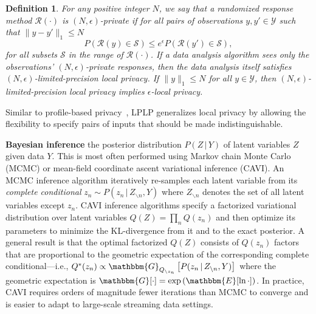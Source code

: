 \documentclass{article}
\newtheorem{definition}{Definition}
\newcommand{\Gqnot}[2]{\mathbbm{G}_{Q_{\backslash #1}}\left[#2\right]}
\begin{document}
\begin{definition}
\label{def:lplp}
For any positive integer $N$, we say that a randomized response method
$\mathcal{R}(\cdot)$ is $(N, \epsilon)$-private if for all pairs of
observations $y, y' \in \mathcal{Y}$ such that $\|y - y'\|_1 \leq N$
\begin{equation}
  \label{eqn:lp_local_privacy}
    P\left(\mathcal{R}(y) \in \mathcal{S}\right) \leq e^\epsilon
      P\left(\mathcal{R}(y') \in \mathcal{S}\right),
        \end{equation}
for all subsets $\mathcal{S}$ in the range of $\mathcal{R}(\cdot)$.
If a data analysis algorithm sees only the observations' $(N,
\epsilon)$-private responses, then the data analysis itself satisfies
$(N, \epsilon)$-limited-precision local privacy. If $\|y\|_1 \leq N$
for all $y \in \mathcal{Y}$, then $(N, \epsilon)$-limited-precision
local privacy implies $\epsilon$-local privacy.
\end{definition}

Similar to profile-based privacy~\cite{GC19}, LPLP generalizes local
privacy by allowing the flexibility to specify pairs of inputs that
should be made indistinguishable.


  \textbf{Bayesian inference}  the posterior
  distribution $P(Z\,|\,Y)$ of latent variables $Z$ given data $Y$. This is
  most often performed using Markov chain Monte Carlo (MCMC) or mean-field
  coordinate ascent variational inference (CAVI). An MCMC inference algorithm
  iteratively re-samples each latent variable from its \emph{complete
  conditional} $z_n \sim P(z_n\,|\,Z_{\backslash n}, Y)$ where $Z_{\backslash
  n}$ denotes the set of all latent variables except $z_n$. CAVI inference
  algorithms specify a factorized variational distribution over latent
  variables $Q(Z) = \prod_n Q(z_n)$ and then optimize its parameters to
  minimize the KL-divergence from it and to the exact posterior. A general
  result is that the optimal factorized $Q(Z)$ consists of $Q(z_n)$ factors
  that are proportional to the geometric expectation of the corresponding
  complete conditional---i.e., $Q^*(z_n) \propto
  \Gqnot{z_n}{P(z_n\,|\,Z_{\backslash n}, Y)}$ where the geometric expectation
  is $\mathbbm{G}[\cdot]=\exp\left(\mathbbm{E}[\ln \cdot]\right)$. In
  practice, CAVI requires orders of magnitude fewer iterations than MCMC to
  converge and is easier to adapt to large-scale streaming data settings.
  
\end{document}

